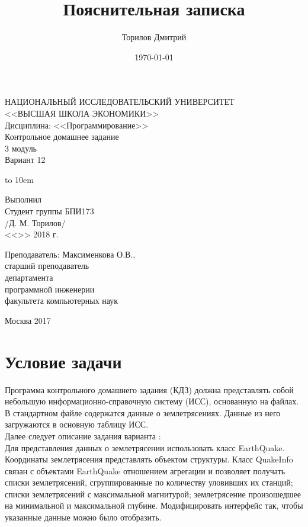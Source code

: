 \documentclass[a4paper,12pt, fleqn]{article}
\author{Торилов Дмитрий}
\title{Пояснительная записка}
\date{\today}
\theoremstyle{plain} %
\theoremstyle{definition} %
\theoremstyle{remark} %
\numberwithin{equation}{section}
\newcommand{\Ssign}{\underline{\hspace{8em}}}
\newcommand{\PeopleField}[1]{
	\vbox to 10em{
		#1\\
		<<\underline{\hspace{1.8em}}>>
		\underline{\hspace{10.5em}}
		2018 г.
	}
}
\begin{document}
\begin{titlepage}
		
	\large
	\begin{center}
		НАЦИОНАЛЬНЫЙ ИССЛЕДОВАТЕЛЬСКИЙ УНИВЕРСИТЕТ\\
		<<ВЫСШАЯ ШКОЛА ЭКОНОМИКИ>>\\
		Дисциплина: <<Программирование>>\\[10em]
		
		Контрольное домашнее задание\\
		3 модуль\\
		Вариант 12\\[7em]	
	\end{center}
	
	\begin{flushright}
		\PeopleField{
			Выполнил\\
			Студент группы БПИ173\\
			\Ssign /Д. М. Торилов/
		}
		
		Преподаватель: Максименкова О.В.,\\
		старший преподаватель\\
		департамента\\
		программной инженерии\\
		факультета компьютерных наук\\[7em]
	\end{flushright}
	
	\begin{center}
		Москва 2017	
	\end{center}
	
	\normalsize
	\newpage

\end{titlepage}

\setcounter{page}{2}
\tableofcontents
\newpage

\section{Условие задачи}
Программа контрольного домашнего задания (КДЗ) должна представлять собой небольшую информационно-справочную систему (ИСС), основанную на файлах. В стандартном файле содержатся данные о землетрясениях. Данные из него загружаются в основную таблицу ИСС.\\[1em]
Далее следует описание задания варианта :\\[1em]
Для представления данных о землетрясении использовать класс EarthQuake. Координаты землетрясения представлять объектом структуры. Класс QuakeInfo связан с объектами EarthQuake отношением агрегации и позволяет получать списки землетрясений, сгруппированные по количеству уловивших их станций; списки землетрясений с максимальной магнитурой; землетрясение произошедшее на минимальной и максимальной глубине. Модифицировать интерфейс так, чтобы указанные данные можно было отобразить.
\end{document}
